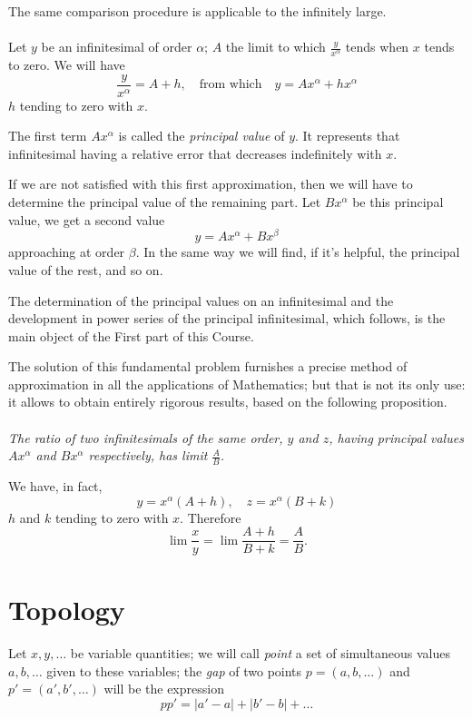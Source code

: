\documentclass[10pt,letterpaper]{book}
\theoremstyle{definition}
\begin{document}
The same comparison procedure is applicable to the infinitely large.

\paragraph{} Let $y$ be an infinitesimal of order $\alpha$; $A$ the limit to which $\frac{y}{x^\alpha}$ tends when $x$ tends to zero. We will have
\[
  \frac{y}{x^\alpha} = A + h,
  \quad\mbox{from which}\quad
  y = Ax^\alpha + hx^\alpha
\]
$h$ tending to zero with $x$.

The first term $Ax^\alpha$ is called the \textit{principal value} of $y$. It represents that infinitesimal having a relative error that decreases indefinitely with $x$.

If we are not satisfied with this first approximation, then we will have to determine the principal value of the remaining part. Let $Bx^\alpha$ be this principal value, we get a second value
\[
  y = Ax^\alpha + B x^\beta
\]
approaching at order $\beta$. In the same way we will find, if it's helpful, the principal value of the rest, and so on.

The determination of the principal values on an infinitesimal and the development in power series of the principal infinitesimal, which follows, is the main object of the First part of this Course.


The solution of this fundamental problem furnishes a precise method of approximation in all the applications of Mathematics; but that is not its only use: it allows to obtain entirely rigorous results, based on the following proposition.

\paragraph{} \textit{The ratio of two infinitesimals of the same order, $y$ and $z$, having principal values $Ax^\alpha$ and $Bx^\alpha$ respectively, has limit $\frac A B$.}

We have, in fact,
\[
  y=x^\alpha(A+h),\quad z = x^\alpha(B + k)
\]
$h$ and $k$ tending to zero with $x$. Therefore
\[
  \lim \frac x y = \lim\frac{A+h}{B+k} = \frac A B.
\]

\section{Topology}

\paragraph{} Let $x,y,\dots$ be variable quantities; we will call \textit{point} a set of simultaneous values $a, b,\dots$ given to these variables; the \textit{gap} of two points $p=(a,b,\dots)$ and $p' = (a',b',\dots)$ will be the expression
\[
  pp' = |a'-a| + |b'-b| + \dots
\]
\end{document}

